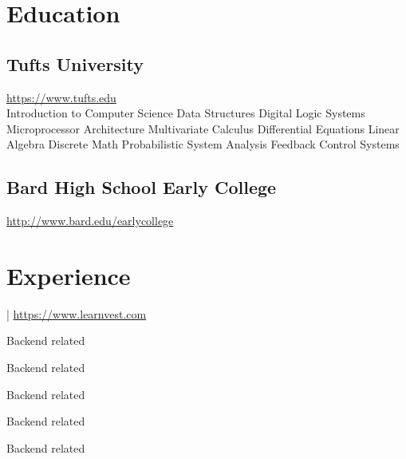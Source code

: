 \documentclass[letterpaper]{deedy-resume}
\begin{document}
\begin{minipage}[t]{0.71\textwidth} 

\section{Education} 

\subsection{Tufts University}

\url{https://www.tufts.edu} \\
\sectionspace
Introduction to Computer Science \textbullet{} Data Structures \textbullet{} Digital Logic Systems \\ Microprocessor Architecture \textbullet{} Multivariate Calculus \textbullet{} Differential Equations \textbullet{} Linear Algebra \textbullet{} Discrete Math \textbullet{} Probabilistic System Analysis \textbullet{} Feedback Control Systems

\sectionspace
\subsection{Bard High School Early College}
\url{http://www.bard.edu/earlycollege} \\
\sectionspace

\section{Experience}
 |
\url{https://www.learnvest.com} \\
\vspace{\topsep}
\begin{tightitemize}

\item Backend related \\
\item Backend related \\
\item Backend related \\
\item Backend related \\
\item Backend related
\end{tightitemize}
\sectionspace 


\end{minipage}
\end{document}
